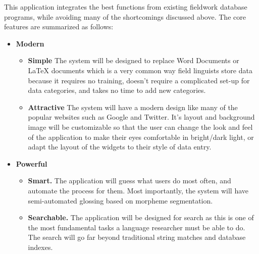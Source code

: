 \documentclass[12pt]{article}
\begin{document}
This application integrates the best functions from existing fieldwork database programs, while avoiding many of the shortcomings discussed above. The core features are summarized as follows: 

\begin{itemize}


\item {\bf Modern}

\begin{itemize}
\item { \bf Simple} The system will be designed to replace Word Documents or LaTeX documents which is a very common way field linguists store data because it requires no training, doesn't require a complicated set-up for data categories, and takes no time to add new categories.  

\item {\bf Attractive} The system will have a modern design like many of the popular websites such as Google and Twitter. It's layout and background image will be customizable so that the user can change the look and feel of the application to make their eyes comfortable  in bright/dark light, or adapt the layout of the widgets to their style of data entry.
\end{itemize}

\item {\bf Powerful}
\begin{itemize}
\item {\bf Smart.} The application will guess what users do most often, and automate the process for them. Most importantly, the system will have semi-automated  glossing based on morpheme segmentation.
\item {\bf  Searchable.} The application will be designed for search as this is one of the most fundamental tasks a language researcher must be able to do. The search will go far beyond traditional string matches and database indexes.
\end{itemize}


\end{itemize}
\end{document}
